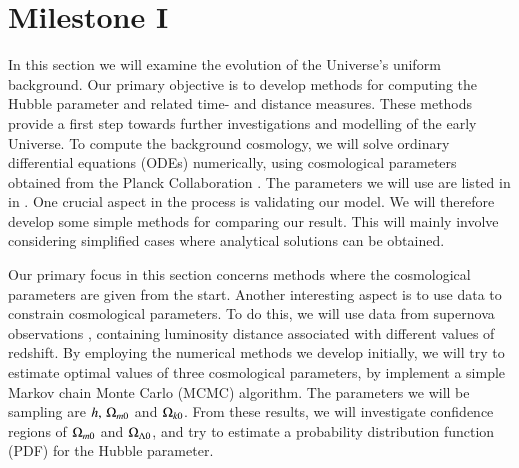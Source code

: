 \section{Milestone I}\label{M1}
In this section we will examine the evolution of the Universe's uniform background. Our primary objective is to develop methods for computing the Hubble parameter and related time- and distance measures. These methods provide a first step towards further investigations and modelling of the early Universe. To compute the background cosmology, we will solve ordinary differential equations (ODEs) numerically, using cosmological parameters obtained from the Planck Collaboration \citep{Planck2020}. The parameters we will use are listed in  in  . One crucial aspect in the process is validating our model. We will therefore develop some simple methods for comparing our result. This will mainly involve considering simplified cases where analytical solutions can be obtained. 

Our primary focus in this section concerns methods where the cosmological parameters are given from the start. Another interesting aspect is to use data to constrain cosmological parameters. To do this, we will use data from supernova observations \citep{Supernova2014Betoule}, containing luminosity distance associated with different values of redshift. By employing the numerical methods we develop initially, we will try to estimate optimal values of three cosmological parameters, by implement a simple Markov chain Monte Carlo (MCMC) algorithm. The parameters we will be sampling are $h,\,\Omega_{m0}$ and $\Omega_{k0}$. From these results, we will investigate confidence regions of $\Omega_{m0}$ and $\Omega_{\Lambda 0}$, and try to estimate a probability distribution function (PDF) for the Hubble parameter. 





